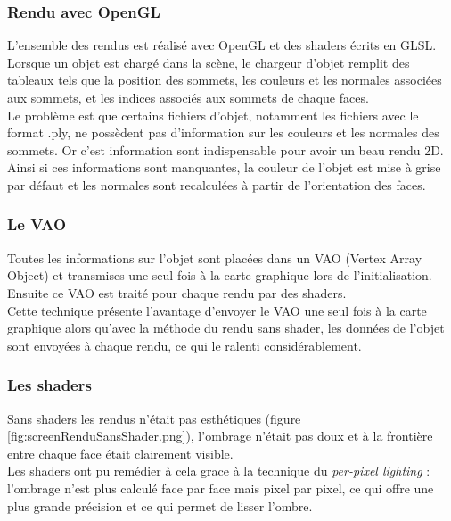 \subsubsection{Rendu avec OpenGL}
L'ensemble des rendus est réalisé avec OpenGL et des shaders écrits en GLSL. Lorsque un objet est chargé dans la scène, le chargeur d'objet remplit des tableaux tels que la position des sommets, les couleurs et les normales associées aux sommets, et les indices associés aux sommets de chaque faces.\\
Le problème est que certains fichiers d'objet, notamment les fichiers avec le format .ply, ne possèdent pas d'information sur les couleurs et les normales des sommets. Or c'est information sont indispensable pour avoir un beau rendu 2D. Ainsi si ces informations sont manquantes, la couleur de l'objet est mise à grise par défaut et les normales sont recalculées à partir de l'orientation des faces.

\subsubsection{Le VAO}
Toutes les informations sur l'objet sont placées dans un VAO (Vertex Array Object) et transmises une seul fois à la carte graphique lors de l'initialisation. Ensuite ce VAO est traité pour chaque rendu par des shaders.\\
Cette technique présente l'avantage d'envoyer le VAO une seul fois à la carte graphique alors qu'avec la méthode du rendu sans shader, les données de l'objet sont envoyées à chaque rendu, ce qui le ralenti considérablement.

\subsubsection{Les shaders}
Sans shaders les rendus n'était pas esthétiques (figure \ref{fig:screenRenduSansShader.png}), l'ombrage n'était pas doux et à la frontière entre chaque face était clairement visible.\\
Les shaders ont pu remédier à cela grace à la technique du \textit{per-pixel lighting} : l'ombrage n'est plus calculé face par face mais pixel par pixel, ce qui offre une plus grande précision et ce qui permet de lisser l'ombre.\\

